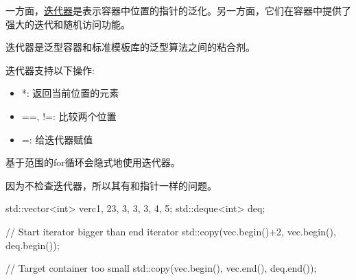 
一方面，\href{http://en.cppreference.com/w/cpp/header/iterator}{迭代器}是表示容器中位置的指针的泛化。另一方面，它们在容器中提供了强大的迭代和随机访问功能。

迭代器是泛型容器和标准模板库的泛型算法之间的粘合剂。

迭代器支持以下操作:

\begin{itemize}
\item 
*: 返回当前位置的元素

\item 
==, !=: 比较两个位置

\item 
=: 给迭代器赋值
\end{itemize}

基于范围的for循环会隐式地使用迭代器。

因为不检查迭代器，所以其有和指针一样的问题。

\begin{cpp}
std::vector<int> verc{1, 23, 3, 3, 3, 4, 5};
std::deque<int> deq;

// Start iterator bigger than end iterator
std::copy(vec.begin()+2, vec.begin(), deq.begin());

// Target container too small
std::copy(vec.begin(), vec.end(), deq.end());
\end{cpp}


































